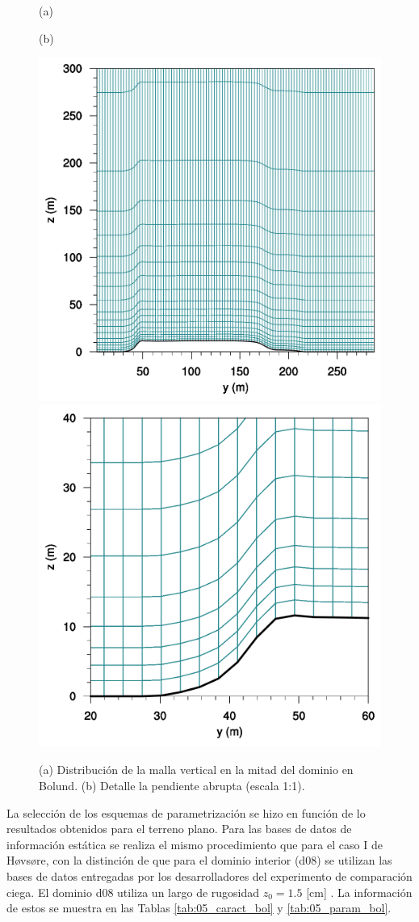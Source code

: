 \vspace*{\fill}
\begin{figure}[H]
	\centering
	\begin{minipage}{0.5\linewidth}
		\center\hspace{1.8cm}(a)
	\end{minipage}%
	\begin{minipage}{0.5\linewidth}
		\center(b)
	\end{minipage}%
	
	\includegraphics[width=0.45\linewidth,trim={0cm 0cm -0cm 0cm},clip]{Imagenes/05/mesh_y50}%
	\includegraphics[width=0.45\linewidth,trim={0cm 0cm 0cm 0cm},clip]{Imagenes/05/hd_mesh_50}%
	
	\caption{(a) Distribución de la malla vertical en la mitad del dominio en Bolund. (b) Detalle la pendiente abrupta (escala 1:1).}
	\label{fig:05_mesh_bol}
\end{figure}
\vspace*{\fill}

\newpage
La selección de los esquemas de parametrización se hizo en función de lo resultados obtenidos para el terreno plano. Para las bases de datos de información estática se realiza el mismo procedimiento que para el caso I de Høvsøre, con la distinción de que para el dominio interior (d08) se utilizan las bases de datos entregadas por los desarrolladores del experimento de comparación ciega. El dominio d08 utiliza un largo de rugosidad $z_0=1.5$ [cm] \cite{Bechmann2011}. La información de estos se muestra en las Tablas \ref{tab:05_caract_bol} y \ref{tab:05_param_bol}.


